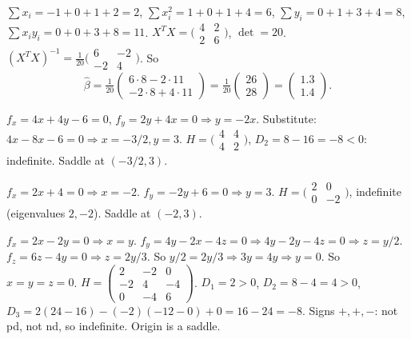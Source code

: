 \begin{solutions}
  \item $\sum x_{i} = -1 + 0 + 1 + 2 = 2$,
        $\sum x_{i}^{2} = 1 + 0 + 1 + 4 = 6$,
        $\sum y_{i} = 0 + 1 + 3 + 4 = 8$,
        $\sum x_{i} y_{i} = 0 + 0 + 3 + 8 = 11$.
        $X^{T} X = \bigl(\begin{smallmatrix} 4 & 2 \\ 2 & 6 \end{smallmatrix}\bigr)$,
        $\det = 20$.
        $(X^{T} X)^{-1} = \tfrac{1}{20}\bigl(\begin{smallmatrix} 6 & -2 \\ -2 & 4 \end{smallmatrix}\bigr)$.
        So
        \[
        \hat{\beta} = \tfrac{1}{20}\begin{pmatrix} 6 \cdot 8 - 2 \cdot 11 \\ -2 \cdot 8 + 4 \cdot 11 \end{pmatrix} = \tfrac{1}{20}\begin{pmatrix} 26 \\ 28 \end{pmatrix} = \begin{pmatrix} 1.3 \\ 1.4 \end{pmatrix}.
        \]

  \item $f_{x} = 4 x + 4 y - 6 = 0$,
        $f_{y} = 2 y + 4 x = 0 \Rightarrow y = -2 x$. Substitute:
        $4 x - 8 x - 6 = 0 \Rightarrow x = -3/2, y = 3$.
        $H = \bigl(\begin{smallmatrix} 4 & 4 \\ 4 & 2 \end{smallmatrix}\bigr)$,
        $D_{2} = 8 - 16 = -8 < 0$: indefinite. Saddle at $(-3/2, 3)$.

  \item $f_{x} = 2 x + 4 = 0 \Rightarrow x = -2$.
        $f_{y} = -2 y + 6 = 0 \Rightarrow y = 3$.
        $H = \bigl(\begin{smallmatrix} 2 & 0 \\ 0 & -2 \end{smallmatrix}\bigr)$,
        indefinite (eigenvalues $2, -2$). Saddle at $(-2, 3)$.

  \item $f_{x} = 2 x - 2 y = 0 \Rightarrow x = y$.
        $f_{y} = 4 y - 2 x - 4 z = 0 \Rightarrow 4 y - 2 y - 4 z = 0 \Rightarrow z = y/2$.
        $f_{z} = 6 z - 4 y = 0 \Rightarrow z = 2 y/3$. So
        $y/2 = 2 y/3 \Rightarrow 3 y = 4 y \Rightarrow y = 0$. So
        $x = y = z = 0$.
        $H = \begin{pmatrix} 2 & -2 & 0 \\ -2 & 4 & -4 \\ 0 & -4 & 6 \end{pmatrix}$.
        $D_{1} = 2 > 0$, $D_{2} = 8 - 4 = 4 > 0$,
        $D_{3} = 2(24 - 16) - (-2)(-12 - 0) + 0 = 16 - 24 = -8$. Signs
        $+, +, -$: not pd, not nd, so indefinite. Origin is a saddle.


\end{solutions}
